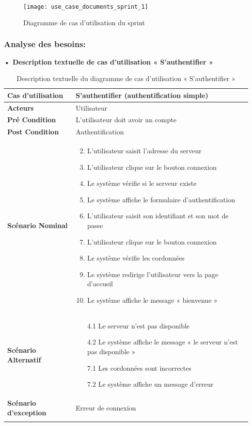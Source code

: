 \begin{figure}[H]
  \centering
  \texttt{[image: use\_case\_documents\_sprint\_1]}
  \caption{Diagramme de cas d'utilisation du sprint }
  \label{fig:UseCaseDiagram1}
\end{figure}

\subsubsection{Analyse des besoins:}
\textbf{•	Description textuelle de cas d'utilisation « S'authentifier »}

\begin{longtable}{|p{5cm}|p{10cm}|}
\hline
\textbf{Cas d'utilisation}&S'authentifier (authentification simple)\\
\hline
\textbf{Acteurs}&Utilisateur\\
\hline
\textbf{Pré Condition}&L'utilisateur doit avoir un compte\\
\hline
\textbf{Post Condition}&Authentification\\
\hline
\textbf{Scénario Nominal}&
\vspace{-\baselineskip}
\begin{enumerate}
    \setcounter{enumi}{1}
  \item L'utilisateur saisit l'adresse du serveur
  \item L'utilisateur clique sur le bouton connexion
  \item Le système vérifie si le serveur existe
  \item Le système affiche le formulaire d'authentification
  \item L'utilisateur saisit son identifiant et son mot de passe
  \item L'utilisateur clique sur le bouton connexion
  \item Le système vérifie les cordonnées
  \item Le système redirige l'utilisateur vers la page d'accueil
  \item Le système affiche le message « bienvenue »
\end{enumerate}\\
\hline
\textbf{Scénario Alternatif}&
\vspace{-\baselineskip}
\begin{enumerate}
      \item [4.1] Le serveur n'est pas disponible
      \item [4.2] Le système affiche le message « le serveur n'est pas disponible »
      \item [7.1] Les cordonnées sont incorrectes
      \item [7.2] Le système affiche un message d'erreur
\end{enumerate}\\
\hline
\textbf{Scénario d'exception}&Erreur de connexion\\
\hline
\caption{Description textuelle du diagramme de cas d'utilisation « S'authentifier »}
\label{tab:use_case_simple_authentification}
\end{longtable}

